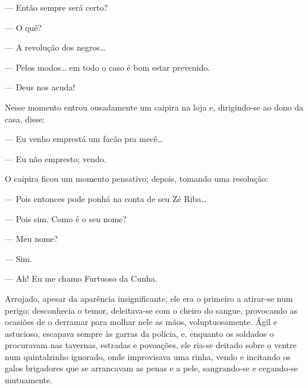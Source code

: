 {--- Então sempre será certo?

--- O quê?

--- A revolução dos negros\ldots{}

--- Pelos modos\ldots{} em todo o caso é bom estar prevenido.


--- Deus nos acuda!

Nesse momento entrou ousadamente um caipira na loja e,
dirigindo-se ao dono da casa, disse:

--- Eu venho emprestá um facão pra mecê\ldots{}

--- Eu não empresto; vendo.

O caipira ficou um momento pensativo; depois, tomando uma
resolução:

--- Pois entonces pode ponhá na conta de seu Zé
Riba\ldots{}

--- Pois sim. Como é o seu nome?

--- Meu nome?

--- Sim.

--- Ah! Eu me chamo Furtuoso da Cunha.



Arrojado, apesar da aparência insignificante, ele era o primeiro
a atirar-se num perigo; desconhecia o temor, deleitava-se com o cheiro
do sangue, provocando as ocasiões de o derramar para molhar nele as
mãos, voluptuosamente. Ágil e astucioso, escapava sempre às
garras da polícia, e, enquanto os soldados o procuravam nas
tavernas, estradas e povoações, ele ria-se deitado sobre o ventre num
quintalzinho ignorado, onde improvisava uma rinha, vendo e incitando os
galos brigadores que se arrancavam as penas e a pele, sangrando-se e
cegando-se mutuamente.



}
